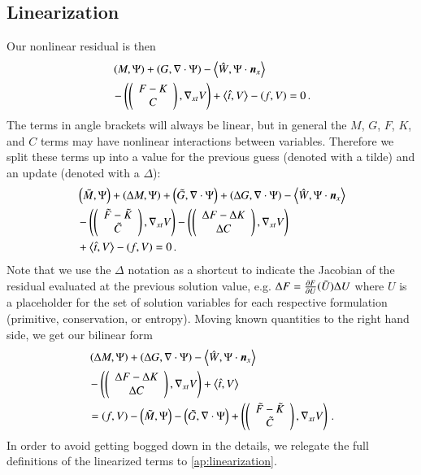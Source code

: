 \documentclass[preprint,12pt]{elsarticle}
\begin{document}
\subsection{Linearization}
Our nonlinear residual is then
\begin{align*}
&\left( M,\Psi \right)+\left( G,\nabla\cdot\Psi \right)-\left\langle \hat W,\Psi\cdot\boldsymbol n_x \right\rangle\\
&-\left( \left( \begin{array}{c} F-K\\ C\\ \end{array} \right),\nabla_{xt} V \right)+\left\langle \hat t,V \right\rangle-\left( f,V \right)=0\,.
\end{align*}
The terms in angle brackets will always be linear, but in general the $M$, $G$, $F$, $K$, and $C$ terms may have nonlinear interactions
between variables.
Therefore we split these terms up into a value for the previous guess (denoted with a tilde) and an update (denoted with a $\Delta$):
\begin{align*}
&\left( \tilde M,\Psi \right) + \left( \Delta M,\Psi \right)
+\left( \tilde G,\nabla\cdot\Psi \right) + \left( \Delta G,\nabla\cdot\Psi \right)
-\left\langle \hat W,\Psi\cdot\boldsymbol n_x \right\rangle\\
&-\left( \left( \begin{array}{c} \tilde F-\tilde K\\ \tilde C\\ \end{array} \right),\nabla_{xt} V \right) - \left( \left( \begin{array}{c} \Delta F-\Delta K\\ \Delta C\\ \end{array} \right),\nabla_{xt} V \right)\\
&+\left\langle \hat t,V \right\rangle-\left( f,V \right)=0\,.
\end{align*}
Note that we use the $\Delta$ notation as a shortcut to indicate the Jacobian of the residual evaluated at the previous solution value, e.g.
$\Delta F=\frac{\partial F}{\partial U}(\tilde U)\Delta U$ where $U$ is a placeholder for the set of solution variables for each respective formulation 
(primitive, conservation, or entropy).
Moving known quantities to the right hand side, we get our bilinear form
\begin{align}
\label{eq:AbstractBilinearForm}
&\left( \Delta M,\Psi \right)
+\left( \Delta G,\nabla\cdot\Psi \right)
-\left\langle \hat W,\Psi\cdot\boldsymbol n_x \right\rangle\\
&-\left( \left( \begin{array}{c} \Delta F-\Delta K\\ \Delta C\\ \end{array} \right),\nabla_{xt} V \right)
+\left\langle \hat t,V \right\rangle\\
&=\left( f,V \right)
-\left( \tilde M,\Psi \right) 
-\left( \tilde G,\nabla\cdot\Psi \right) 
+\left( \left( \begin{array}{c} \tilde F-\tilde K\\ \tilde C\\ \end{array} \right),\nabla_{xt} V \right)\,.
\end{align}
In order to avoid getting bogged down in the details, we relegate the full definitions of the linearized terms to \ref{ap:linearization}.


%                                                                                            
%                                                                                            
%      
\end{document}
